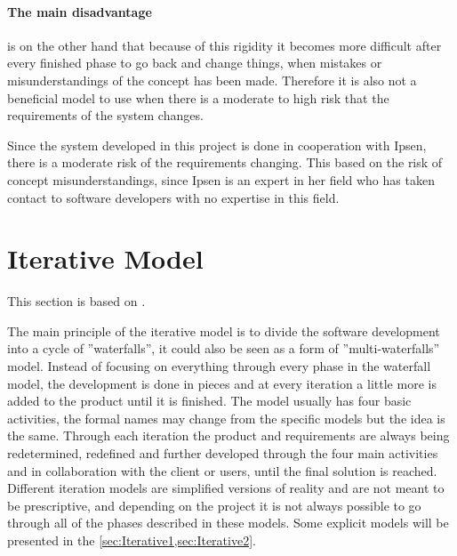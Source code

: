 \paragraph{The main disadvantage} is on the other hand that because of this rigidity it becomes more difficult after every finished phase to go back and change things, when mistakes or misunderstandings of the concept has been made.
Therefore it is also not a beneficial model to use when there is a moderate to high risk that the requirements of the system changes.

Since the system developed in this project is done in cooperation with Ipsen, there is a moderate risk of the requirements changing.
This based on the risk of concept misunderstandings, since Ipsen is an expert in her field who has taken contact to software developers with no expertise in this field.

\section{Iterative Model} \label{sec:iterativModel}
This section is based on \cite{InteractionDesign,Rod-Aalborg,Iterative-Toolsqa,Benyon}.

The main principle of the iterative model is to divide the software development into a cycle of ''waterfalls'', it could also be seen as a form of ''multi-waterfalls'' model.
Instead of focusing on everything through every phase in the waterfall model, the development is done in pieces and at every iteration a little more is added to the product until it is finished.
The model usually has four basic activities, the formal names may change from the specific models but the idea is the same. 
Through each iteration the product and requirements are always being redetermined, redefined and further developed through the four main activities and in collaboration with the client or users, until the final solution is reached.
Different iteration models are simplified versions of reality and are not meant to be prescriptive, and depending on the project it is not always possible to go through all of the phases described in these models. 
Some explicit models will be presented in the \cref{sec:Iterative1,sec:Iterative2}.


